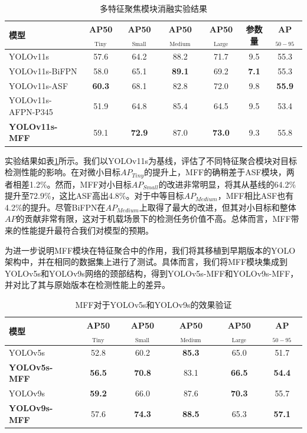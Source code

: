 \begin{table}[!ht]
    \centering
    \caption{多特征聚焦模块消融实验结果}
    \label{t3}
    \renewcommand{\arraystretch}{1.2}
    \setlength{\tabcolsep}{5pt} %
    \begin{tabular}{l c c c c c c}
        \toprule
        模型 & \textbf{AP50$_\text{Tiny}$} & \textbf{AP50$_\text{Small}$} & \textbf{AP50$_\text{Medium}$} & \textbf{AP50$_\text{Large}$} & 参数量 & \textbf{AP$_{50-95}$} \\
        \midrule
        YOLOv11s & 57.6 & 64.2 & 88.2 & 71.7 & 9.5 & 55.3 \\
        YOLOv11s-BiFPN & 58.0 & 65.1 & \textbf{89.1} & 69.2 & \textbf{7.1} & 55.3 \\
        YOLOv11s-ASF & \textbf{60.3} & 68.1 & 82.8 & 72.0 & 9.8 & \textbf{55.9} \\
        YOLOv11s-AFPN-P345 & 51.9 & 64.8 & 85.4 & 64.5 & 9.5 & 53.4 \\
        \textbf{YOLOv11s-MFF} & 59.1 & \textbf{72.9} & 87.0 & \textbf{73.0} & 9.3 &  55.8 \\
        \bottomrule
    \end{tabular}
\end{table}

实验结果如表\ref{t3}所示。我们以YOLOv11s为基线，评估了不同特征聚合模块对目标检测性能的影响。在对微小目标$AP_{Tiny}$的提升上，MFF的确稍差于ASF模块，两者相差1.2\%。然而，MFF对小目标$AP_{Small}$的改进非常明显，将其从基线的64.2\%提升至72.9\%，这比ASF高出4.8\%。对于中等目标$AP_{Medium}$，MFF相比ASF也有4.2\%的提升。尽管BiFPN在$AP_{Medium}$上取得了最大的改进，但其对小目标和整体$AP$的贡献非常有限，这对于机载场景下的检测任务价值不高。总体而言，MFF带来的性能提升最符合我们对模型的预期。

为进一步说明MFF模块在特征聚合中的作用，我们将其移植到早期版本的YOLO架构中，并在相同的数据集上进行了测试。具体而言，我们将MFF模块集成到YOLOv5s和YOLOv9s网络的颈部结构，得到YOLOv5s-MFF和YOLOv9s-MFF，并对比了其与原始版本在检测性能上的差异。

\begin{table}[htbp]
    \centering
    \caption{MFF对于YOLOv5s和YOLOv9s的效果验证}
    \label{t4}
    \renewcommand{\arraystretch}{1.2}
    \setlength{\tabcolsep}{8pt}
    \begin{tabular}{l c c c c c}
        \toprule
        模型 & \textbf{AP50$_\text{Tiny}$} & \textbf{AP50$_\text{Small}$} & \textbf{AP50$_\text{Medium}$} & \textbf{AP50$_\text{Large}$} & \textbf{AP$_{50-95}$} \\
        \midrule
        YOLOv5s & 52.8 & 60.2 & \textbf{85.3} & 65.0 & 51.7 \\
        \textbf{YOLOv5s-MFF} & \textbf{56.5} & \textbf{70.8} & 83.1 & \textbf{66.5} & \textbf{54.4} \\
        \midrule
        YOLOv9s & \textbf{59.2} & 66.0 & 87.6 & \textbf{70.3} & 55.7 \\
        \textbf{YOLOv9s-MFF} & 57.6 & \textbf{74.3} & \textbf{88.5} & 65.3 & \textbf{57.1}  \\
        \bottomrule
    \end{tabular}
\end{table}


